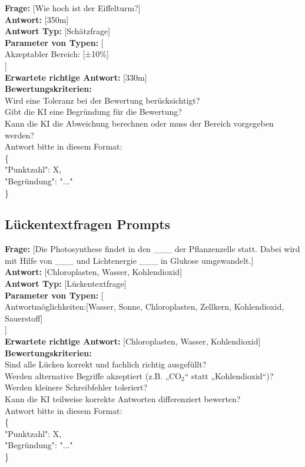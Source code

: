 \documentclass[a4paper,12pt]{article}
\begin{document}
\textbf{Frage:} [Wie hoch ist der Eiffelturm?] \\
\textbf{Antwort:} [350m] \\
\textbf{Antwort Typ:} [Schätzfrage] \\
\textbf{Parameter von Typen:} [ \\
Akzeptabler Bereich: [±10\%] \\
] \\
\textbf{Erwartete richtige Antwort:} [330m] \\
\textbf{Bewertungskriterien:} \\
Wird eine Toleranz bei der Bewertung berücksichtigt? \\
Gibt die KI eine Begründung für die Bewertung? \\
Kann die KI die Abweichung berechnen oder muss der Bereich vorgegeben werden? \\
Antwort bitte in diesem Format: \\
\{ \\
"Punktzahl": X, \\
"Begründung": "..." \\
\}

\subsection{Lückentextfragen Prompts}

\textbf{Frage:} [Die Photosynthese findet in den \_\_\_ der Pflanzenzelle statt. Dabei wird mit Hilfe von \_\_\_ und Lichtenergie \_\_\_ in Glukose umgewandelt.] \\
\textbf{Antwort:} [Chloroplasten, Wasser, Kohlendioxid] \\
\textbf{Antwort Typ:} [Lückentextfrage] \\
\textbf{Parameter von Typen:} [ \\
Antwortmöglichkeiten:[Wasser, Sonne, Chloroplasten, Zellkern, Kohlendioxid, Sauerstoff] \\
] \\
\textbf{Erwartete richtige Antwort:} [Chloroplasten, Wasser, Kohlendioxid] \\
\textbf{Bewertungskriterien:} \\
Sind alle Lücken korrekt und fachlich richtig ausgefüllt? \\
Werden alternative Begriffe akzeptiert (z.B. „CO$_2$“ statt „Kohlendioxid“)? \\
Werden kleinere Schreibfehler toleriert? \\
Kann die KI teilweise korrekte Antworten differenziert bewerten? \\
Antwort bitte in diesem Format: \\
\{ \\
"Punktzahl": X, \\
"Begründung": "..." \\
\}
\end{document}
